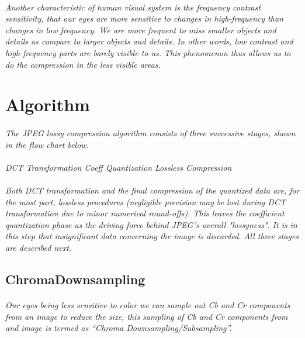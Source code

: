 \documentclass[12pt, letterpaper]{article}
\begin{document}
\paragraph{}\textit{Another characteristic of human visual system is the frequency contrast sensitivity, that our eyes are more sensitive to changes in high-frequency than changes in low frequency. We are more frequent to miss smaller objects and details as compare to larger objects and details. In other words, low contrast and high frequency parts are barely visible to us. This phenomenon thus allows us to do the compression in the less visible areas. }
\section{{\color{blue}Algorithm}}
\paragraph{}\textit{The JPEG lossy compression algorithm consists of three successive stages, shown in the flow chart below.}

\paragraph{}\textit{DCT Transformation \rightarrow Coeff Quantization \rightarrow Lossless Compression}

\paragraph{}\textit{Both DCT transformation and the final compression of the quantized data are, for the most part, lossless procedures (negligible precision may be lost during DCT transformation due to minor numerical round-offs). This leaves the coefficient quantization phase as the driving force behind JPEG’s overall "lossyness". It is in this step that insignificant data concerning the image is discarded. All three stages are described next.}
\subsection{ChromaDownsampling}
\paragraph{}\textit{Our eyes being less sensitive to color we can sample out Cb and Cr components from an image to reduce the size, this sampling of Cb and Cr components from and image is termed as “Chroma Downsampling/Subsampling”.}
\end{document}

